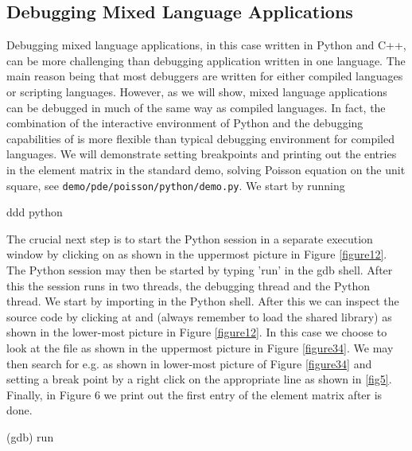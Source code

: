 \begin{code}
\section{Debugging Mixed Language Applications}
Debugging mixed language applications, in this case written in
Python and C++, can be more challenging than debugging application
written in one language. The main reason being that most debuggers are written
for either compiled languages or scripting languages. However, as
we will show, mixed language applications can be debugged in much of the same way
as compiled languages. In fact, the combination of the interactive environment
of Python and the debugging capabilities of  is more flexible than typical
debugging environment for compiled languages. We will demonstrate setting breakpoints and
printing out the entries in the element matrix in the standard \dolfin demo,
solving Poisson equation on the unit square, see \texttt{demo/pde/}\texttt{poisson/python/}\texttt{demo.py}. We start by running
\begin{code}
ddd python
\end{code}
The crucial next step is to start the Python session in a separate execution window by clicking on  as shown in the uppermost picture in  Figure \ref{figure12}.
The Python session may then be started by typing 'run' in the gdb shell.
After this the session runs in two threads, the debugging thread and the
Python thread. We start by importing \dolfin in the Python shell. After this we can inspect the \dolfin source code by clicking at  and  (always remember to load the shared library) as shown in the lower-most picture in Figure \ref{figure12}. In this case we choose to look at the file  as shown in the uppermost picture in Figure \ref{figure34}. We may then search for e.g.  as shown in lower-most picture of Figure \ref{figure34} and
setting a break point by a right click on the appropriate line as shown in \ref{fig5}. Finally, in Figure 6
we print out the first entry of the element matrix after  is done.
\begin{code}
(gdb) run
\end{code}
\begin{figure}[htbp]
   \\

\end{figure}
\end{code}
